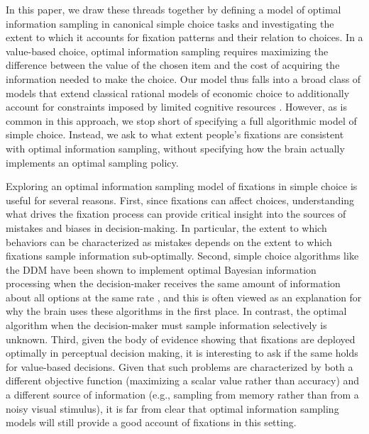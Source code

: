 In this paper, we draw these threads together by defining a model of optimal information sampling in canonical simple choice tasks and investigating the extent to which it accounts for fixation patterns and their relation to choices.  In a value-based choice, optimal information sampling requires maximizing the difference between the value of the chosen item and the cost of acquiring the information needed to make the choice. Our model thus falls into a broad class of models that extend classical rational models of economic choice \citep{savage1954foundations,vonneumann1944theory} to additionally account for constraints imposed by limited cognitive resources \citep{lewis2014computational,griffiths2015rational,lieder2020resourcerational,gershman2015computational,sims1998stickiness,caplin2013behavioral}. However, as is common in this approach, we stop short of specifying a full algorithmic model of simple choice. Instead, we ask to what extent people's fixations are consistent with optimal information sampling, without specifying how the brain actually implements an optimal sampling policy.

Exploring an optimal information sampling model of fixations in simple choice is useful for several reasons. First, since fixations can affect choices, understanding what drives the fixation process can provide critical insight into the sources of mistakes and biases in decision-making. In particular, the extent to which behaviors can be characterized as mistakes depends on the extent to which fixations sample information sub-optimally. 
Second, simple choice algorithms like the DDM have been shown to implement optimal Bayesian information processing when the decision-maker receives the same amount of information about all options at the same rate \citep{bogacz2006physics,moreno-bote2010decision,drugowitsch2012cost,bitzer2014perceptual,tajima2016optimal,tajima2019optimal,fudenberg2018speed}, and this is often viewed as an explanation for why the brain uses these algorithms in the first place. In contrast, the optimal algorithm when the decision-maker must sample information selectively is unknown. Third, given the body of evidence showing that fixations are deployed optimally in perceptual decision making, it is interesting to ask if the same holds for value-based decisions. Given that such problems are characterized by both a different objective function (maximizing a scalar value rather than accuracy) and a different source of information (e.g., sampling from memory \citealp{biderman2020what,bakkour2019hippocampus,wang2022mixing} rather than from a noisy visual stimulus), it is far from clear that optimal information sampling models will still provide a good account of fixations in this setting.

